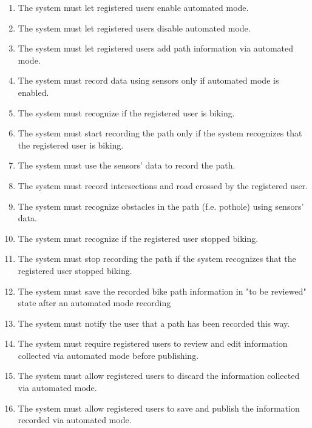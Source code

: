 \begin{enumerate}[label=•  R\arabic*:]
\subsubsection*{Bike Path Management - Automated mode}
    \item The system must let registered users enable automated mode.
    \item The system must let registered users disable automated mode.
    \item The system must let registered users add path information via automated mode.
    \item The system must record data using sensors only if automated mode is enabled.
    \item The system must recognize if the registered user is biking.
    \item The system must start recording the path only if the system recognizes that the registered user is biking.
    \item The system must use the sensors' data to record the path.
    \item The system must record intersections and road crossed by the registered user.
    \item The system must recognize obstacles in the path (f.e. pothole) using sensors' data.
    \item The system must recognize if the registered user stopped biking.
    \item The system must stop recording the path if the system recognizes that the registered user stopped biking.
    \item The system must save the recorded bike path information in "to be reviewed" state after an automated mode recording
    \item The system must notify the user that a path has been recorded this way.
    \item The system must require registered users to review and edit information collected via automated mode before publishing.
    \item The system must allow registered users to discard the information collected via automated mode.
    \item The system must allow registered users to save and publish the information recorded via automated mode.
    


\end{enumerate}
